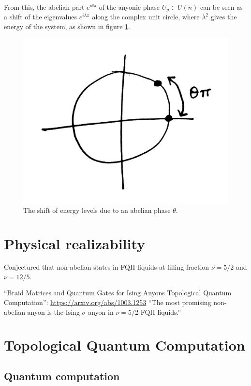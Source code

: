 \documentclass[a4paper,10pt,oneside]{book}
\theoremstyle{plain}
\theoremstyle{definition}
\theoremstyle{remark}
\begin{document}
{From this, the abelian part $e^{i\theta\pi}$ of the anyonic phase $U_p \in U(n)$ can be seen as a shift of the eigenvalues $e^{i\lambda\pi}$ along the complex unit circle, where $\lambda^2$ gives the energy of the system, as shown in figure \cref{fig: abelian phase shift}.

\begin{figure}
  \centering
  \includegraphics[width=0.5\linewidth]{img/abelian-phase-shift.jpg}
  \caption{The shift of energy levels due to an abelian phase $\theta$.}
  \label{fig: abelian phase shift}
\end{figure}
















\chapter{Physical realizability}

Conjectured that non-abelian states in FQH liquids at filling fraction $\nu = 5/2$ and $\nu = 12/5$. \cite{TODO} \cite{wang book}

``Braid Matrices and Quantum Gates for Ising Anyons Topological Quantum Computation'': \url{https://arxiv.org/abs/1003.1253}
``The most promising non-abelian anyon is the Ising $\sigma$ anyon in $\nu = 5/2$ FQH liquids.'' -- \cite[sec. 7.2]{wang book}





\chapter{Topological Quantum Computation}

\section{Quantum computation}

}
\end{document}
